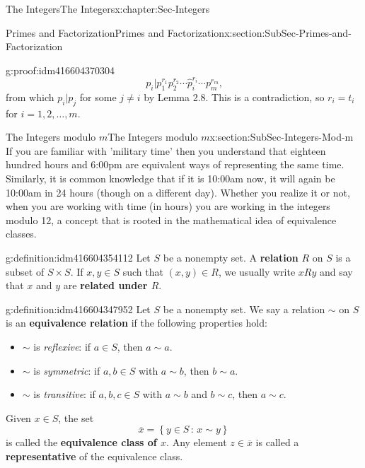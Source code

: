 \documentclass[oneside,10pt,]{book}
\newcommand{\terminology}[1]{\textbf{#1}}
\numberwithin{equation}{section}
\newcommand{\setof}[2]{{\left\{#1\,\colon\,#2\right\}}}
\begin{document}
\begin{chapterptx}{The Integers}{}{The Integers}{}{}{x:chapter:Sec-Integers}
\begin{sectionptx}{Primes and Factorization}{}{Primes and Factorization}{}{}{x:section:SubSec-Primes-and-Factorization}
\begin{proofptx}{}{g:proof:idm416604370304}
\begin{equation*}
p_i  | p_1^{r_1} p_2^{r_2} \cdots \hat{p}_i^{r_i} \cdots p_m^{r_m}\text{,}
\end{equation*}
from which \(p_i | p_j\) for some \(j\ne i\) by Lemma 2.8. This is a contradiction, so \(r_i = t_i\) for \(i = 1, 2, \ldots, m\).%
\end{proofptx}
\end{sectionptx}
%
%
\typeout{************************************************}
\typeout{************************************************}
%
\begin{sectionptx}{The Integers modulo \(m\)}{}{The Integers modulo \(m\)}{}{}{x:section:SubSec-Integers-Mod-m}
If you are familiar with 'military time' then you understand that eighteen hundred hours and 6:00pm are equivalent ways of representing the same time. Similarly, it is common knowledge that if it is 10:00am now, it will again be 10:00am in 24 hours (though on a different day). Whether you realize it or not, when you are working with time (in hours) you are working in the integers modulo 12, a concept that is rooted in the mathematical idea of equivalence classes.%
\begin{definition}{}{g:definition:idm416604354112}%
Let \(S\) be a nonempty set. A \terminology{relation} \(R\) on \(S\) is a subset of \(S\times S\). If \(x,y\in S\) such that \((x,y)\in R\), we usually write \(xRy\) and say that \(x\) and \(y\) are \terminology{related under \(R\)}.%
\end{definition}
\begin{definition}{}{g:definition:idm416604347952}%
Let \(S\) be a nonempty set. We say a relation \(\sim\) on \(S\) is an \terminology{equivalence relation} if the following properties hold:%
\begin{itemize}[label=\textbullet]
\item{}\(\sim\) is \emph{reflexive}: if \(a\in S\), then \(a\sim a\).%
\item{}\(\sim\) is \emph{symmetric}: if \(a,b\in S\) with \(a\sim b\), then \(b\sim a\).%
\item{}\(\sim\) is \emph{transitive}: if \(a,b,c\in S\) with \(a\sim b\) and \(b\sim c\), then \(a\sim c\).%
\end{itemize}
%
\par
Given \(x\in S\), the set%
\begin{equation*}
\overline{x} = \setof{y\in S}{x\sim y}
\end{equation*}
is called the \terminology{equivalence class of \(x\)}. Any element \(z\in \overline{x}\) is called a \terminology{representative} of the equivalence class.%

\end{definition}
\end{sectionptx}
\end{chapterptx}
\end{document}
